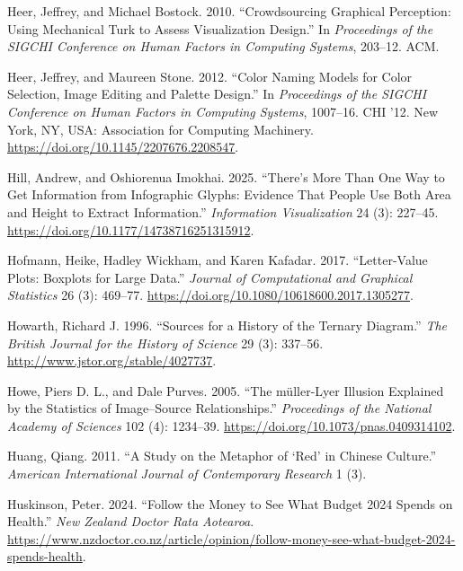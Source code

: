 \documentclass[
  letterpaper,
  DIV=11,
  numbers=noendperiod]{scrreprt}
\newlength{\cslhangindent}
\newenvironment{CSLReferences}[2] %
 {\begin{list}{}{%
  \setlength{\itemindent}{0pt}
  \setlength{\leftmargin}{0pt}
  \setlength{\parsep}{0pt}
  \ifodd #1
   \setlength{\leftmargin}{\cslhangindent}
   \setlength{\itemindent}{-1\cslhangindent}
  \fi
  \setlength{\itemsep}{#2\baselineskip}}}
 {\end{list}}
\begin{document}
\begin{CSLReferences}{1}{0}
Heer, Jeffrey, and Michael Bostock. 2010. {``Crowdsourcing Graphical
Perception: Using Mechanical Turk to Assess Visualization Design.''} In
\emph{Proceedings of the SIGCHI Conference on Human Factors in Computing
Systems}, 203--12. ACM.

Heer, Jeffrey, and Maureen Stone. 2012. {``Color Naming Models for Color
Selection, Image Editing and Palette Design.''} In \emph{Proceedings of
the SIGCHI Conference on Human Factors in Computing Systems}, 1007--16.
CHI '12. New York, NY, USA: Association for Computing Machinery.
\url{https://doi.org/10.1145/2207676.2208547}.

Hill, Andrew, and Oshiorenua Imokhai. 2025. {``There's More Than One Way
to Get Information from Infographic Glyphs: Evidence That People Use
Both Area and Height to Extract Information.''} \emph{Information
Visualization} 24 (3): 227--45.
\url{https://doi.org/10.1177/14738716251315912}.

Hofmann, Heike, Hadley Wickham, and Karen Kafadar. 2017. {``Letter-Value
Plots: Boxplots for Large Data.''} \emph{Journal of Computational and
Graphical Statistics} 26 (3): 469--77.
\url{https://doi.org/10.1080/10618600.2017.1305277}.

Howarth, Richard J. 1996. {``Sources for a History of the Ternary
Diagram.''} \emph{The British Journal for the History of Science} 29
(3): 337--56. \url{http://www.jstor.org/stable/4027737}.

Howe, Piers D. L., and Dale Purves. 2005. {``The m{ü}ller-Lyer Illusion
Explained by the Statistics of Image--Source Relationships.''}
\emph{Proceedings of the National Academy of Sciences} 102 (4):
1234--39. \url{https://doi.org/10.1073/pnas.0409314102}.

Huang, Qiang. 2011. {``A Study on the Metaphor of {`Red'} in Chinese
Culture.''} \emph{American International Journal of Contemporary
Research} 1 (3).

Huskinson, Peter. 2024. {``Follow the Money to See What Budget 2024
Spends on Health.''} \emph{New Zealand Doctor Rata Aotearoa}.
\url{https://www.nzdoctor.co.nz/article/opinion/follow-money-see-what-budget-2024-spends-health}.


\end{CSLReferences}
\end{document}
